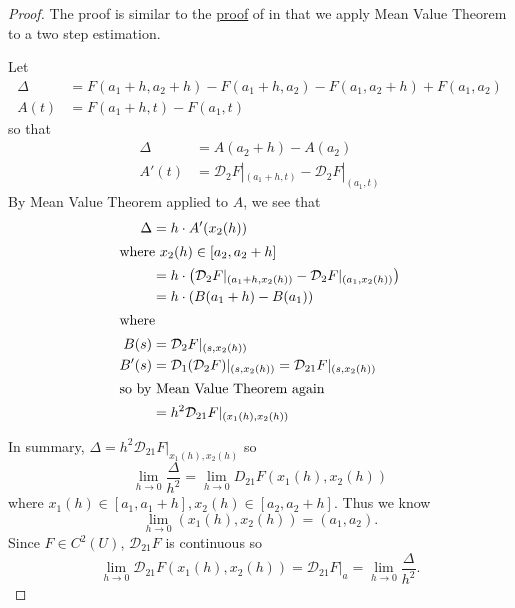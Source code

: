 \documentclass[a4paper]{article}
\newcommand*{\D}{\mathcal{D}}
\theoremstyle{definition}
\begin{document}
\begin{proof}
  The proof is similar to the \hyperref[proof:C1 implies differentiability]{proof} of  in that we apply Mean Value Theorem to a two step estimation.
   \begin{center}
  \end{center}
 Let
  \begin{align*}
    \Delta &= F(a_1 + h, a_2 + h) - F(a_1 + h, a_2) - F(a_1, a_2 + h) + F(a_1, a_2) \\
    A(t) &= F(a_1 + h, t) - F(a_1, t)
  \end{align*}
  so that
  \begin{align*}
    \Delta &= A(a_2 + h) - A(a_2) \\
    A'(t) &= \D_2 F|_{(a_1 + h, t)} - \D_2 F|_{(a_1, t)}
  \end{align*}
  By Mean Value Theorem applied to \(A\), we see that
  \begin{align*}
    \Delta &= h \cdot A'(x_2(h)) \\
    \intertext{where \(x_2(h) \in [a_2, a_2 + h]\)}
           &= h \cdot \left( \D_2 F|_{(a_1 + h, x_2(h))} - \D_2 F|_{(a_1, x_2(h))} \right) \\
           &= h \cdot (B(a_1 + h) - B(a_1)) \\
    \intertext{where}
    B(s) &= \D_2 F|_{(s, x_2(h))} \\
    B'(s) &= \D_1 (\D_2 F)|_{(s, x_2(h))} = \D_{21} F|_{(s, x_2(h))} \\
    \intertext{so by Mean Value Theorem again}
           &= h^2 \D_{21} F|_{(x_1(h), x_2(h))}
  \end{align*}

  In summary, \(\Delta = h^2 \D_{21} F|_{x_1(h), x_2(h)}\) so
  \[
    \lim_{h \to 0} \frac{\Delta}{h^2} = \lim_{h \to 0} D_{21} F(x_1(h), x_2(h))
  \]
  where \(x_1(h) \in [a_1, a_1 + h], x_2(h) \in [a_2, a_2 + h]\). Thus we know
  \[
    \lim_{h \to 0} (x_1(h), x_2(h)) = (a_1, a_2).
  \]
  Since \(F \in C^2(U)\), \(\D_{21} F\) is continuous so
  \[
    \lim_{h \to 0} \D_{21} F(x_1(h), x_2(h)) = \D_{21} F|_a = \lim_{h \to 0} \frac{\Delta}{h^2}.
  \]
\end{proof}
\end{document}
